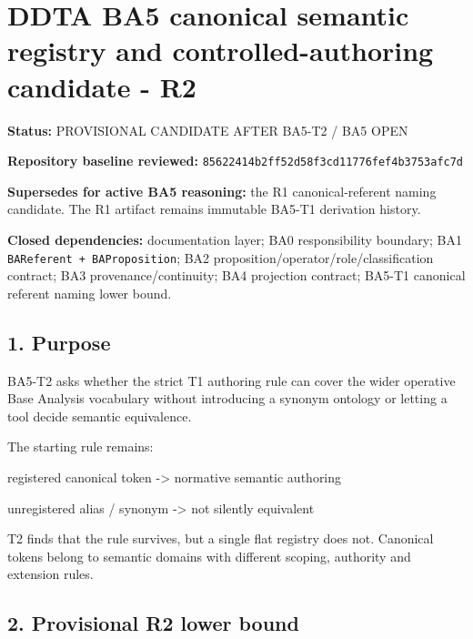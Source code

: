 \documentclass[
  10pt,
  a4paper,
]{article}
\author{}
\date{}
\newenvironment{Shaded}{}{}
\newcommand{\NormalTok}[1]{#1}
\begin{document}
\section{DDTA BA5 canonical semantic registry and controlled-authoring
candidate -
R2}\label{ddta-ba5-canonical-semantic-registry-and-controlled-authoring-candidate---r2}

\textbf{Status:} PROVISIONAL CANDIDATE AFTER BA5-T2 / BA5 OPEN

\textbf{Repository baseline reviewed:}
\texttt{85622414b2ff52d58f3cd11776fef4b3753afc7d}

\textbf{Supersedes for active BA5 reasoning:} the R1 canonical-referent
naming candidate. The R1 artifact remains immutable BA5-T1 derivation
history.

\textbf{Closed dependencies:} documentation layer; BA0 responsibility
boundary; BA1 \texttt{BAReferent\ +\ BAProposition}; BA2
proposition/operator/role/classification contract; BA3
provenance/continuity; BA4 projection contract; BA5-T1 canonical
referent naming lower bound.

\subsection{1. Purpose}\label{purpose}

BA5-T2 asks whether the strict T1 authoring rule can cover the wider
operative Base Analysis vocabulary without introducing a synonym
ontology or letting a tool decide semantic equivalence.

The starting rule remains:

\begin{Shaded}
\begin{Highlighting}[]
\NormalTok{registered canonical token}
\NormalTok{    {-}\textgreater{} normative semantic authoring}

\NormalTok{unregistered alias / synonym}
\NormalTok{    {-}\textgreater{} not silently equivalent}
\end{Highlighting}
\end{Shaded}

T2 finds that the rule survives, but a single flat registry does not.
Canonical tokens belong to semantic domains with different scoping,
authority and extension rules.

\subsection{2. Provisional R2 lower
bound}\label{provisional-r2-lower-bound}
\end{document}
